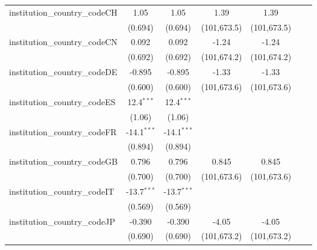 \begin{tabular}{lcccccc}
   institution\_country\_codeCH          & 1.05           & 1.05           & 1.39          & 1.39          &               &   \\   
                                         & (0.694)        & (0.694)        & (101,673.5)   & (101,673.5)   &               &   \\   
   institution\_country\_codeCN          & 0.092          & 0.092          & -1.24         & -1.24         &               &   \\   
                                         & (0.692)        & (0.692)        & (101,674.2)   & (101,674.2)   &               &   \\   
   institution\_country\_codeDE          & -0.895         & -0.895         & -1.33         & -1.33         &               &   \\   
                                         & (0.600)        & (0.600)        & (101,673.6)   & (101,673.6)   &               &   \\   
   institution\_country\_codeES          & 12.4$^{***}$   & 12.4$^{***}$   &               &               &               &   \\   
                                         & (1.06)         & (1.06)         &               &               &               &   \\   
   institution\_country\_codeFR          & -14.1$^{***}$  & -14.1$^{***}$  &               &               &               &   \\   
                                         & (0.894)        & (0.894)        &               &               &               &   \\   
   institution\_country\_codeGB          & 0.796          & 0.796          & 0.845         & 0.845         &               &   \\   
                                         & (0.700)        & (0.700)        & (101,673.6)   & (101,673.6)   &               &   \\   
   institution\_country\_codeIT          & -13.7$^{***}$  & -13.7$^{***}$  &               &               &               &   \\   
                                         & (0.569)        & (0.569)        &               &               &               &   \\   
   institution\_country\_codeJP          & -0.390         & -0.390         & -4.05         & -4.05         &               &   \\   
                                         & (0.690)        & (0.690)        & (101,673.2)   & (101,673.2)   &               &   \\   

\end{tabular}
